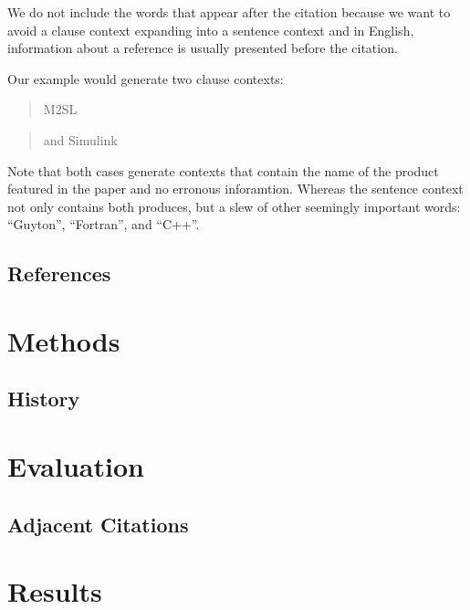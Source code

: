 \documentclass[10pt, conference, compsocconf]{IEEEtran}
\begin{document}
We do not include the words that appear after the citation because we want to avoid a clause context expanding into a sentence context and
in English, information about a reference is usually presented before the citation.

Our example would generate two clause contexts:
\begin{quote}
M2SL
\end{quote}

\begin{quote}
and Simulink
\end{quote}

Note that both cases generate contexts that contain the name of the product featured in the paper and no erronous inforamtion. Whereas the
sentence context not only contains both produces, but a slew of other seemingly important words: ``Guyton'', ``Fortran'', and ``C++''.

\subsection{References}

\section{Methods}\label{sec:methods}

\subsection{History}

\section{Evaluation}

\subsection{Adjacent Citations}

\section{Results}\label{sec:results}
\end{document}
